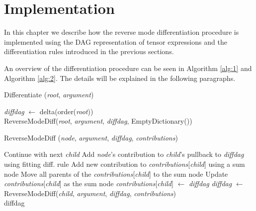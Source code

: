 \documentclass[12pt, a4paper]{report} %
\begin{document}
\FloatBarrier
\section{Implementation}
In this chapter we describe how the reverse mode differentiation procedure is implemented using the DAG representation of tensor expressions and the differentiation rules introduced in the previous sections.

An overview of the differentiation procedure can be seen in Algorithm \ref{alg:1} and Algorithm \ref{alg:2}.
The details will be explained in the following paragraphs.

\begin{algorithm}
    \caption[Driver for DAG Differentiation]{Differentiate (\textit{root}, \textit{argument})}\label{alg:1}
    \begin{algorithmic}
        \State \textit{diffdag} $\gets$ delta(order(\textit{root}))  \\
        \Return ReverseModeDiff(\textit{root}, \textit{argument}, \textit{diffdag}, EmptyDictionary())
    \end{algorithmic}
\end{algorithm}

\begin{algorithm}
    \caption[Recursive DAG Differentiation]{ReverseModeDiff (\textit{node}, \textit{argument}, \textit{diffdag}, \textit{contributions})}\label{alg:2}
    \begin{algorithmic}
                \State Continue with next \textit{child}
            \EndIf
            \State Add \textit{node}'s contribution to \textit{child}'s pullback to \textit{diffdag} using fitting diff. rule
                \State Add new contribution to \textit{contributions}[\textit{child}] using a sum node
                \State Move all parents of the \textit{contributions}[\textit{child}] to the sum node
                \State Update \textit{contributions}[\textit{child}] as the sum node
            \Else
                \State \textit{contributions}[\textit{child}] $\gets$ \textit{diffdag}
                \State \textit{diffdag} $\gets$ ReverseModeDiff(\textit{child}, \textit{argument}, \textit{diffdag}, \textit{contributions})
            \EndIf
        \EndFor \\
        \Return diffdag
    \end{algorithmic}
\end{algorithm}
\end{document}

